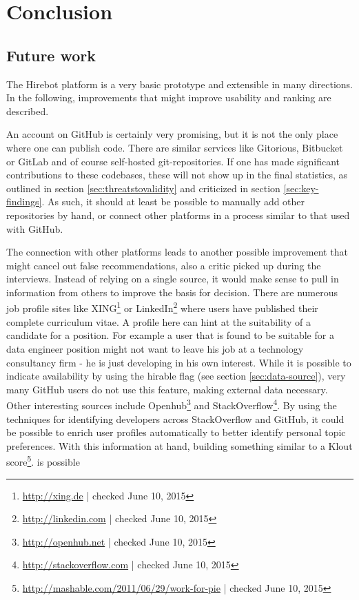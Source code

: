 \chapter{Conclusion}\label{ch:conclusion}
\section{Future work}\label{sec:future-work}
The Hirebot platform is a very basic prototype and extensible in many directions. In the following, improvements that might improve usability and ranking are described.

An account on GitHub is certainly very promising, but it is not the only place where one can publish code. There are similar services like Gitorious, Bitbucket or GitLab and of course self-hosted git-repositories. If one has made significant contributions to these codebases, these will not show up in the final statistics, as outlined in section \ref{sec:threatstovalidity} and criticized in section \ref{sec:key-findings}. As such, it should at least be possible to manually add other repositories by hand, or connect other platforms in a process similar to that used with GitHub.

The connection with other platforms leads to another possible improvement that might cancel out false recommendations, also a critic picked up during the interviews. Instead of relying on a single source, it would make sense to pull in information from others to improve the basis for decision. There are numerous job profile sites like XING\footnote{\url{http://xing.de} | checked June 10, 2015} or LinkedIn\footnote{\url{http://linkedin.com} | checked June 10, 2015} where users have published their complete curriculum vitae. A profile here can hint at the suitability of a candidate for a position. For example a user that is found to be suitable for a data engineer position might not want to leave his job at a technology consultancy firm - he is just developing in his own interest. While it is possible to indicate availability by using the hirable flag (see section \ref{sec:data-source}), very many GitHub users do not use this feature, making external data necessary. Other interesting sources include Openhub\footnote{\url{http://openhub.net} | checked June 10, 2015} and StackOverflow\footnote{\url{http://stackoverflow.com} | checked June 10, 2015}. By using the techniques for identifying developers across StackOverflow and GitHub\cite{vfs:2012}, it could be possible to enrich user profiles automatically to better identify personal topic preferences. With this information at hand, building something similar to a Klout score\footnote{\url{http://mashable.com/2011/06/29/work-for-pie} | checked June 10, 2015}. is possible


